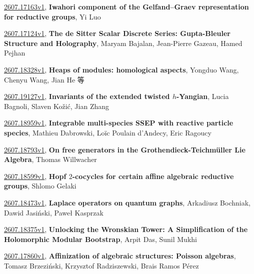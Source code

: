 \documentclass[9pt, a4paper]{article}
\theoremstyle{plain}
\theoremstyle{definition}
\theoremstyle{remark}
\newcommand{\arxiv}[3]{\href{https://arxiv.org/abs/#1}{#1}, \textbf{\textcolor{arxivblue}{#2}}, #3}
\begin{document}
\arxiv{2607.17163v1}{Iwahori component of the Gelfand--Graev representation for reductive groups}{Yi Luo}

\arxiv{2607.17124v1}{The de Sitter Scalar Discrete Series: Gupta-Bleuler Structure and Holography}{Maryam Bajalan, Jean-Pierre Gazeau, Hamed Pejhan}

\arxiv{2607.18328v1}{Heaps of modules: homological aspects}{Yongduo Wang, Chenyu Wang, Jian He 等}

\arxiv{2607.19127v1}{Invariants of the extended twisted $h$-Yangian}{Lucia Bagnoli, Slaven Kožić, Jian Zhang}

\arxiv{2607.18959v1}{Integrable multi-species SSEP with reactive particle species}{Mathieu Dabrowski, Loïc Poulain d'Andecy, Eric Ragoucy}

\arxiv{2607.18793v1}{On free generators in the Grothendieck-Teichmüller Lie Algebra}{Thomas Willwacher}

\arxiv{2607.18599v1}{Hopf $2$-cocycles for certain affine algebraic reductive groups}{Shlomo Gelaki}

\arxiv{2607.18473v1}{Laplace operators on quantum graphs}{Arkadiusz Bochniak, Dawid Jasiński, Paweł Kasprzak}

\arxiv{2607.18375v1}{Unlocking the Wronskian Tower: A Simplification of the Holomorphic Modular Bootstrap}{Arpit Das, Sunil Mukhi}

\arxiv{2607.17860v1}{Affinization of algebraic structures: Poisson algebras}{Tomasz Brzeziński, Krzysztof Radziszewski, Brais Ramos Pérez}

\end{document}
